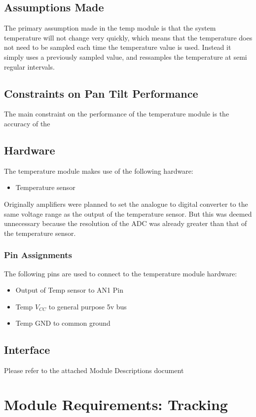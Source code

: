 \documentclass[]{report}
\begin{document}
\subsection{Assumptions Made}
The primary assumption made in the temp module is that the system temperature will not change very quickly, which means that the temperature does not need to be sampled each time the temperature value is used. Instead it simply uses a previously sampled value, and ressamples the temperature at semi regular intervals.

\subsection{Constraints on Pan Tilt Performance}
The main constraint on the performance of the temperature module is the accuracy of the 

\subsection{Hardware}
The temperature module makes use of the following hardware:
\begin{itemize}
	\item Temperature sensor
\end{itemize}
Originally amplifiers were planned to set the analogue to digital converter to the same voltage range as the output of the temperature sensor. But this was deemed unnecessary because the resolution of the ADC was already greater than that of the temperature sensor.

\subsubsection{Pin Assignments}
The following pins are used to connect to the temperature module hardware:
\begin{itemize}
	\item Output of Temp sensor to AN1 Pin
	\item Temp $V_{CC}$ to general purpose 5v bus
	\item Temp GND to common ground
\end{itemize}

\subsection{Interface}
Please refer to the attached Module Descriptions document

\section{Module Requirements: Tracking}
\end{document}
